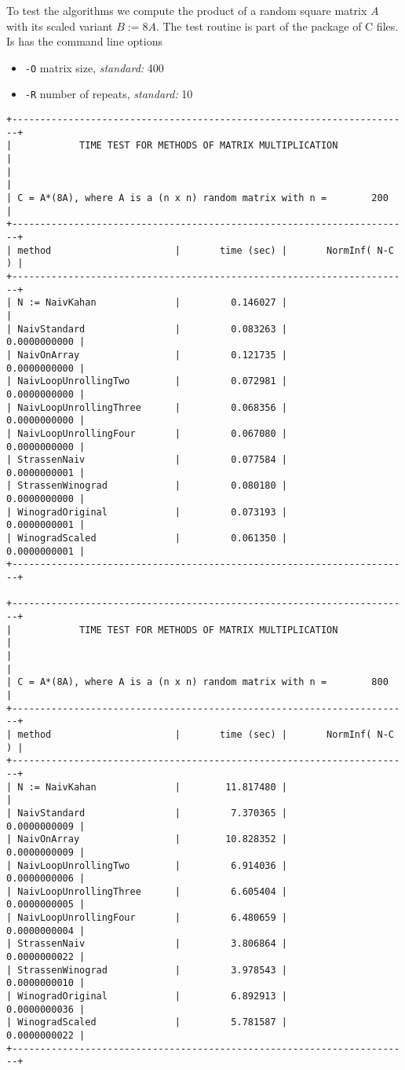 \documentclass{amsart}
\begin{document}
To test the algorithms we compute the product of a random square matrix $A$ with its scaled variant $B:=8A$. The test routine is part of the package of C files. Is has the command line options
\begin{itemize}
\item \texttt{-O} matrix size, \emph{standard:} 400
\item \texttt{-R} number of repeats, \emph{standard:} 10
\end{itemize}

\begin{verbatim}
+-----------------------------------------------------------------------+
|            TIME TEST FOR METHODS OF MATRIX MULTIPLICATION             |
|                                                                       |
| C = A*(8A), where A is a (n x n) random matrix with n =        200    |
+-----------------------------------------------------------------------+
| method                      |       time (sec) |       NormInf( N-C ) |
+-----------------------------------------------------------------------+
| N := NaivKahan              |         0.146027 |                      |
| NaivStandard                |         0.083263 |         0.0000000000 |
| NaivOnArray                 |         0.121735 |         0.0000000000 |
| NaivLoopUnrollingTwo        |         0.072981 |         0.0000000000 |
| NaivLoopUnrollingThree      |         0.068356 |         0.0000000000 |
| NaivLoopUnrollingFour       |         0.067080 |         0.0000000000 |
| StrassenNaiv                |         0.077584 |         0.0000000001 |
| StrassenWinograd            |         0.080180 |         0.0000000000 |
| WinogradOriginal            |         0.073193 |         0.0000000001 |
| WinogradScaled              |         0.061350 |         0.0000000001 |
+-----------------------------------------------------------------------+

+-----------------------------------------------------------------------+
|            TIME TEST FOR METHODS OF MATRIX MULTIPLICATION             |
|                                                                       |
| C = A*(8A), where A is a (n x n) random matrix with n =        800    |
+-----------------------------------------------------------------------+
| method                      |       time (sec) |       NormInf( N-C ) |
+-----------------------------------------------------------------------+
| N := NaivKahan              |        11.817480 |                      |
| NaivStandard                |         7.370365 |         0.0000000009 |
| NaivOnArray                 |        10.828352 |         0.0000000009 |
| NaivLoopUnrollingTwo        |         6.914036 |         0.0000000006 |
| NaivLoopUnrollingThree      |         6.605404 |         0.0000000005 |
| NaivLoopUnrollingFour       |         6.480659 |         0.0000000004 |
| StrassenNaiv                |         3.806864 |         0.0000000022 |
| StrassenWinograd            |         3.978543 |         0.0000000010 |
| WinogradOriginal            |         6.892913 |         0.0000000036 |
| WinogradScaled              |         5.781587 |         0.0000000022 |
+-----------------------------------------------------------------------+
\end{verbatim}
\end{document}
